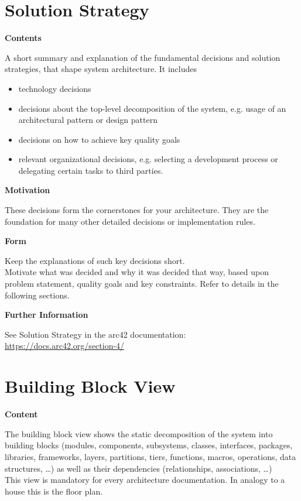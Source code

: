 \documentclass[12pt,a4paper]{article}
\newcommand{\minititle}[1]{%
  \par\addvspace{0.6\baselineskip}%
  \noindent\textbf{#1}\par\nobreak%
  \noindent\ignorespaces%
}
\begin{document}
\section{Solution Strategy}

\minititle{Contents}
A short summary and explanation of the fundamental decisions and solution strategies, that shape system architecture. It includes
\begin{itemize}
  \item technology decisions
  \item decisions about the top-level decomposition of the system, e.g. usage of an architectural pattern or design pattern
  \item decisions on how to achieve key quality goals
  \item relevant organizational decisions, e.g. selecting a development process or delegating certain tasks to third parties.
\end{itemize}

\minititle{Motivation}
These decisions form the cornerstones for your architecture. They are the foundation for many other detailed decisions or implementation rules.

\minititle{Form}
Keep the explanations of such key decisions short.\\
Motivate what was decided and why it was decided that way, based upon problem statement, quality goals and key constraints. Refer to details in the following sections.


\minititle{Further Information}
See Solution Strategy in the arc42 documentation:
\href{https://docs.arc42.org/section-4/}{https://docs.arc42.org/section-4/}

\section{Building Block View}

\minititle{Content}
The building block view shows the static decomposition of the system into building blocks (modules, components, subsystems, classes, interfaces, packages, libraries, frameworks, layers, partitions, tiers, functions, macros, operations, data structures, \dots) as well as their dependencies (relationships, associations, \dots)\\
This view is mandatory for every architecture documentation. In analogy to a house this is the floor plan.
\end{document}
